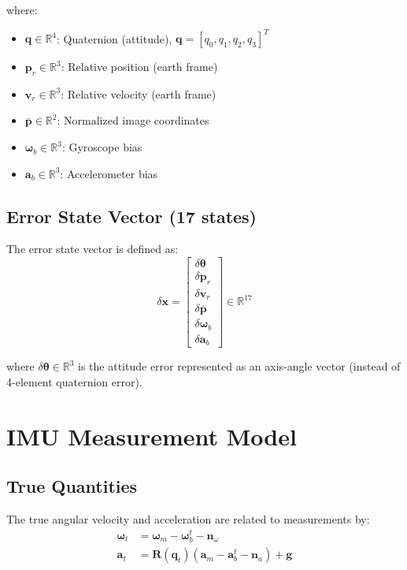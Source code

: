 \documentclass[11pt,a4paper]{article}
\newcommand{\quat}{\mathbf{q}}
\newcommand{\pr}{\mathbf{p}_r}
\newcommand{\vr}{\mathbf{v}_r}
\newcommand{\pbar}{\bar{\mathbf{p}}}
\newcommand{\bgyr}{\bm{\omega}_b}
\newcommand{\bacc}{\mathbf{a}_b}
\newcommand{\R}{\mathbf{R}}
\begin{document}
where:
\begin{itemize}
    \item $\quat \in \mathbb{R}^4$: Quaternion (attitude), $\quat = [q_0, q_1, q_2, q_3]^T$
    \item $\pr \in \mathbb{R}^3$: Relative position (earth frame)
    \item $\vr \in \mathbb{R}^3$: Relative velocity (earth frame)
    \item $\pbar \in \mathbb{R}^2$: Normalized image coordinates
    \item $\bgyr \in \mathbb{R}^3$: Gyroscope bias
    \item $\bacc \in \mathbb{R}^3$: Accelerometer bias
\end{itemize}

\subsection{Error State Vector (17 states)}
The error state vector is defined as:
\begin{equation}
    \delta\mathbf{x} = \begin{bmatrix} \delta\bm{\theta} \\ \delta\pr \\ \delta\vr \\ \delta\pbar \\ \delta\bgyr \\ \delta\bacc \end{bmatrix}
    \in \mathbb{R}^{17}
\end{equation}

where $\delta\bm{\theta} \in \mathbb{R}^3$ is the attitude error represented as an axis-angle vector (instead of 4-element quaternion error).

\section{IMU Measurement Model}

\subsection{True Quantities}
The true angular velocity and acceleration are related to measurements by:
\begin{align}
    \bm{\omega}_t &= \bm{\omega}_m - \bgyr^t - \mathbf{n}_\omega \\
    \mathbf{a}_t &= \R(\quat_t)(\mathbf{a}_m - \bacc^t - \mathbf{n}_a) + \mathbf{g}
\end{align}
\end{document}
